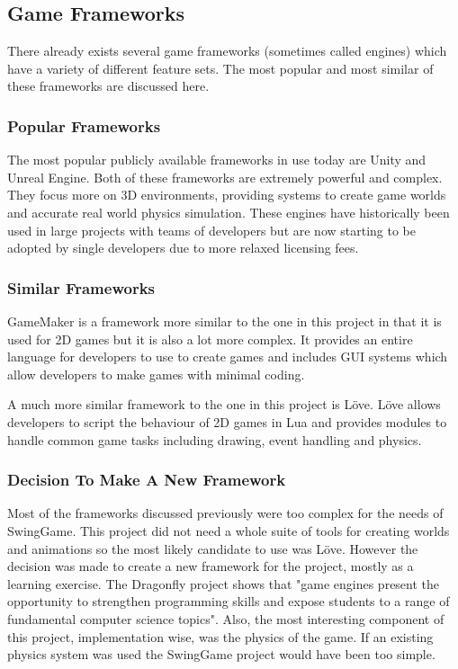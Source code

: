 \documentclass[]{report}
\begin{document}
		\subsection{Game Frameworks}
		There already exists several game frameworks (sometimes called engines) which have a variety of different feature sets. The most popular and most similar of these frameworks are discussed here.
			\subsubsection{Popular Frameworks}
			The most popular publicly available frameworks in use today are Unity\cite{unity} and Unreal Engine\cite{unreal}. Both of these frameworks are extremely powerful and complex. They focus more on 3D environments, providing systems to create game worlds and accurate real world physics simulation. These engines have historically been used in large projects with teams of developers but are now starting to be adopted by single developers due to more relaxed licensing fees.
			\subsubsection{Similar Frameworks}
			GameMaker\cite{gamemaker} is a framework more similar to the one in this project in that it is used for 2D games but it is also a lot more complex. It provides an entire language for developers to use to create games and includes GUI systems which allow developers to make games with minimal coding.
			
			A much more similar framework to the one in this project is Löve\cite{love}. Löve allows developers to script the behaviour of 2D games in Lua and provides modules to handle common game tasks including drawing, event handling and physics.
			\subsubsection{Decision To Make A New Framework}
			Most of the frameworks discussed previously were too complex for the needs of SwingGame. This project did not need a whole suite of tools for creating worlds and animations so the most likely candidate to use was Löve. However the decision was made to create a new framework for the project, mostly as a learning exercise. The Dragonfly project shows that "game engines present the opportunity to strengthen programming skills and expose students to a range of fundamental computer science topics"\cite{dragonfly}. Also, the most interesting component of this project, implementation wise, was the physics of the game. If an existing physics system was used the SwingGame project would have been too simple.
			
\end{document}
